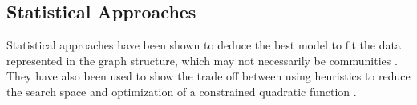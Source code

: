 \documentclass{report}
\begin{document}
	
	
	\subsection{Statistical Approaches}
	Statistical approaches have been shown to deduce the best model to fit the data represented in the graph structure, which may not necessarily be communities \cite{newman2004finding}.
	They have also been used to show the trade off between using heuristics to reduce the search space and optimization of a constrained quadratic function \cite{yang2013hierarchical}.
	
\end{document}
